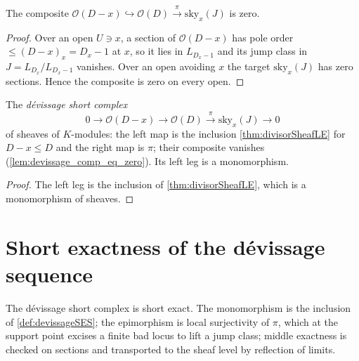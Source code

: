 \begin{lemma}
  \label{lem:devissage_comp_eq_zero}
  \leanok
  The composite \(\mathcal O(D-x) \hookrightarrow \mathcal O(D) \xrightarrow{\ \pi\ }
  \mathrm{sky}_x(J)\) is zero.
\end{lemma}
\begin{proof}
  \leanok
  Over an open \(U \ni x\), a section of \(\mathcal O(D-x)\) has pole order \(\le (D-x)_x = D_x - 1\)
  at \(x\), so it lies in \(L_{D_x - 1}\) and its jump class in \(J = L_{D_x}/L_{D_x - 1}\) vanishes.
  Over an open avoiding \(x\) the target \(\mathrm{sky}_x(J)\) has zero sections. Hence the composite
  is zero on every open.
\end{proof}

\begin{definition}
  \label{def:devissageSES}
  \leanok
  The \emph{dévissage short complex}
  \[
    0 \longrightarrow \mathcal O(D-x) \longrightarrow \mathcal O(D)
      \xrightarrow{\ \pi\ } \mathrm{sky}_x(J) \longrightarrow 0
  \]
  of sheaves of \(K\)-modules: the left map is the inclusion \ref{thm:divisorSheafLE} for
  \(D - x \le D\) and the right map is \(\pi\); their composite vanishes
  (\ref{lem:devissage_comp_eq_zero}). Its left leg is a monomorphism.
\end{definition}
\begin{proof}
  \leanok
  The left leg is the inclusion of \ref{thm:divisorSheafLE}, which is a monomorphism of sheaves.
\end{proof}

\section{Short exactness of the dévissage sequence}

The dévissage short complex is short exact. The monomorphism is the inclusion of
\ref{def:devissageSES}; the epimorphism is local surjectivity of \(\pi\), which at the support point
excises a finite bad locus to lift a jump class; middle exactness is checked on sections and
transported to the sheaf level by reflection of limits.

